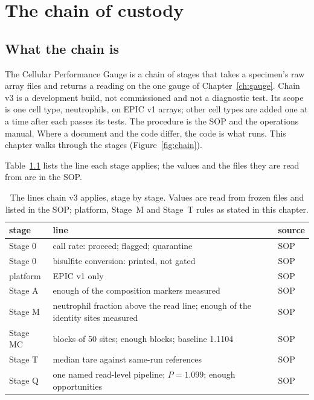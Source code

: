 \chapter{The chain of custody}\label{ch:chain}

\section{What the chain is}

The Cellular Performance Gauge is a chain of stages that takes a specimen's raw array files and returns a reading on the one gauge of
Chapter~\ref{ch:gauge}. Chain v3 is a development build, not commissioned and not a diagnostic test. Its scope is one cell type, neutrophils,
on EPIC v1 arrays; other cell types are added one at a time after each passes its tests. The
procedure is the SOP and the operations manual.
Where a document and the code differ, the code is what runs. This chapter walks through the stages (Figure~\ref{fig:chain}).

Table~\ref{tab:p4_gates} lists the line each stage applies; the values and the files they are read from are in the SOP.

\begin{table}[htbp]\centering\small
\caption{The lines chain v3 applies, stage by stage. Values are read from frozen files and listed in the SOP; platform, Stage~M and Stage~T
rules as stated in this chapter. \calibrated}\label{tab:p4_gates}
\begin{tabular}{@{}lp{}p{}@{}}\toprule
stage & line & source \\\midrule
Stage 0 & call rate: proceed; flagged; quarantine & SOP \\
Stage 0 & bisulfite conversion: printed, not gated & SOP \\
platform & EPIC v1 only & SOP \\
Stage A & enough of the composition markers measured & SOP \\
Stage M & neutrophil fraction above the read line; enough of the identity sites measured & SOP \\
Stage MC & blocks of 50 sites; enough blocks; baseline 1.1104 & SOP \\
Stage T & median tare against same-run references & SOP \\
Stage Q & one named read-level pipeline; $P=1.099$; enough opportunities & SOP \\
\bottomrule
\end{tabular}
\end{table}

